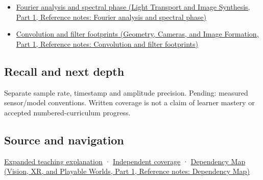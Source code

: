 \hypertarget{appendix-1077ea8fc737-used-by}{}

\begin{itemize}
\tightlist
\item
  \href{../04-Light-Transport-and-Image-Synthesis-P01/main.pdf\#appendix-b60686ba06a1}{Fourier analysis and spectral phase (Light Transport and Image Synthesis, Part 1, Reference notes: Fourier analysis and spectral phase)}
\item
  \href{../03-Geometry-Cameras-and-Image-Formation-P01/main.pdf\#appendix-d5b3c692d9f0}{Convolution and filter footprints (Geometry, Cameras, and Image Formation, Part 1, Reference notes: Convolution and filter footprints)}
\end{itemize}

\subsection{Recall and next depth}\label{appendix-1077ea8fc737-recall-and-next-depth}

\hypertarget{appendix-1077ea8fc737-recall-and-next-depth}{}

Separate sample rate, timestamp and amplitude precision. Pending: measured sensor/model conventions. Written coverage is not a claim of learner mastery or accepted numbered-curriculum progress.

\subsection{Source and navigation}\label{appendix-1077ea8fc737-source-and-navigation}

\hypertarget{appendix-1077ea8fc737-source-and-navigation}{}

\hyperref[04-visual-computing-ii-ch042-sampling-is-a-question-of-what-remains-distinguishable]{Expanded teaching explanation} · \hyperref[appendix-fd090d982a15-xr01---independent-seeing-and-representation-source]{Independent coverage} · \href{../07-Vision-XR-and-Playable-Worlds-P01/main.pdf\#appendix-4ad47bdd269a}{Dependency Map (Vision, XR, and Playable Worlds, Part 1, Reference notes: Dependency Map)}
